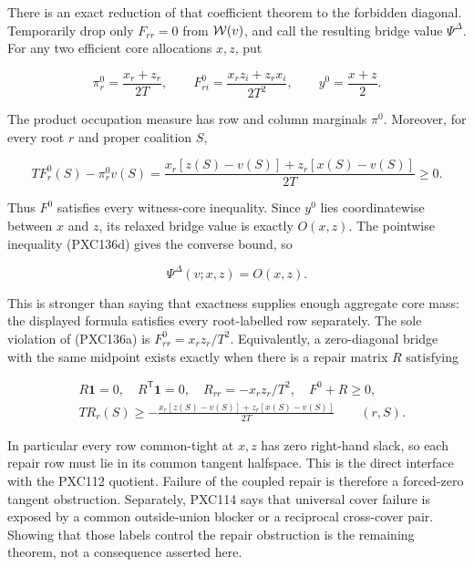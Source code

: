 \documentclass[11pt]{article}
\newcommand{\one}{\mathbf 1}
\begin{document}
There is an exact reduction of that coefficient theorem to the forbidden
diagonal.  Temporarily drop only \(F_{rr}=0\) from \({\cal W}(v)\), and call
the resulting bridge value \(\Psi^\Delta\).  For any two efficient core
allocations \(x,z\), put

\begin{equation}
 \pi_r^0=\frac{x_r+z_r}{2T},\qquad
 F^0_{ri}=\frac{x_rz_i+z_rx_i}{2T^2},\qquad
 y^0=\frac{x+z}{2}.                                    \tag{PXC137a}
\end{equation}

The product occupation measure has row and column marginals \(\pi^0\).
Moreover, for every root \(r\) and proper coalition \(S\),

\begin{equation}
 T F^0_r(S)-\pi_r^0v(S)
 =\frac{x_r[z(S)-v(S)]+z_r[x(S)-v(S)]}{2T}\ge0.        \tag{PXC137b}
\end{equation}

Thus \(F^0\) satisfies every witness-core inequality.  Since \(y^0\) lies
coordinatewise between \(x\) and \(z\), its relaxed bridge value is exactly
\(O(x,z)\).  The pointwise inequality (PXC136d) gives the converse bound, so

\[
                         \Psi^\Delta(v;x,z)=O(x,z).
\]

This is stronger than saying that exactness supplies enough aggregate core
mass: the displayed formula satisfies every root-labelled row separately.
The sole violation of (PXC136a) is
\(F^0_{rr}=x_rz_r/T^2\).  Equivalently, a zero-diagonal bridge with the same
midpoint exists exactly when there is a repair matrix \(R\) satisfying

\begin{align}
 &R\one=0,\quad R^{\mathsf T}\one=0,\quad
 R_{rr}=-x_rz_r/T^2,\quad F^0+R\ge0,\nonumber\\
 &T R_r(S)\ge
 -\frac{x_r[z(S)-v(S)]+z_r[x(S)-v(S)]}{2T}
       \qquad(r,S).                                      \tag{PXC137c}
\end{align}

In particular every row common-tight at \(x,z\) has zero right-hand slack,
so each repair row must lie in its common tangent halfspace.  This is the
direct interface with the PXC112 quotient.  Failure of the coupled repair
is therefore a forced-zero tangent obstruction.  Separately, PXC114 says
that universal cover failure is exposed by a common outside-union blocker
or a reciprocal cross-cover pair.  Showing that those labels control the
repair obstruction is the remaining theorem, not a consequence asserted
here.
\end{document}
